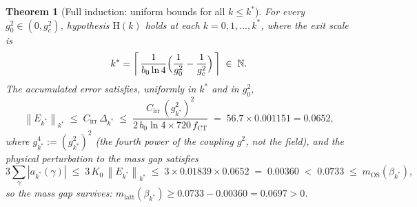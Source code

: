 \documentclass[11pt,a4paper]{amsart}
\newtheorem{theorem}{Theorem}[section]
\theoremstyle{definition}
\newcommand{\norm}[1]{\left\|#1\right\|}
\newcommand{\gB}{g^2_c}
\newcommand{\CT}{\mathrm{CT}}
\begin{document}
\begin{theorem}[Full induction: uniform bounds for all $k \le k^*$]
\label{thm:RG_full}
For every $g^2_0 \in (0,\gB)$, hypothesis $\mathrm{H}(k)$ holds at each
$k = 0,1,\ldots,k^*$, where the exit scale is
\begin{equation}
\label{eq:kstar_expl}
  k^* = \left\lceil\,
  \frac{1}{b_0\ln 4}\Bigl(\frac{1}{g^2_0} - \frac{1}{\gB}\Bigr)
  \,\right\rceil
  \;\in\; \mathbb{N}.
\end{equation}
The accumulated error satisfies, uniformly in $k^*$ and in $g^2_0$,
\begin{equation}
\label{eq:Dkstar}
  \norm{E_{k^*}}_{k^*} \;\le\; C_{\mathrm{irr}}\,\Delta_{k^*}
  \;\le\; \frac{C_{\mathrm{irr}}\,(g^2_{k^*})^2}{2\,b_0\ln 4 \times 720\,f_{\CT}}
  \;=\; 56.7\times 0.001151 = 0.0652,
\end{equation}
where $g^4_{k^*} := (g^2_{k^*})^2$ (the fourth power of the coupling $g^2$, not the field),
and the \emph{physical} perturbation to the mass gap satisfies
\begin{equation}
\label{eq:phys_perturb}
  3\sum_\gamma |a_{k^*}(\gamma)|
  \;\le\; 3\,K_0\,\norm{E_{k^*}}_{k^*}
  \;\le\; 3\times 0.01839\times 0.0652
  \;=\; 0.00360
  \;<\; 0.0733
  \;\le\; m_{\mathrm{OS}}(\beta_{k^*}),
\end{equation}
so the mass gap survives: $m_{\mathrm{latt}}(\beta_{k^*}) \ge 0.0733 - 0.00360 = 0.0697 > 0$.
\end{theorem}
\end{document}
